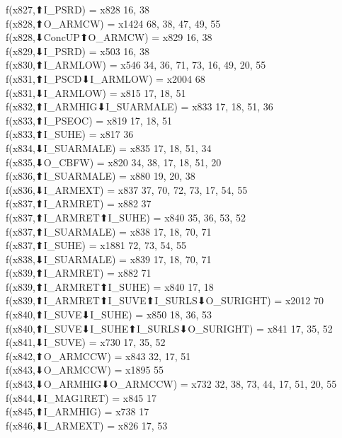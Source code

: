 f(x827,⬆I_PSRD) = x828 {16, 38} \\
f(x828,⬆O_ARMCW) = x1424 {68, 38, 47, 49, 55} \\
f(x828,⬇ConcUP⬆O_ARMCW) = x829 {16, 38} \\
f(x829,⬇I_PSRD) = x503 {16, 38} \\
f(x830,⬆I_ARMLOW) = x546 {34, 36, 71, 73, 16, 49, 20, 55} \\
f(x831,⬆I_PSCD⬇I_ARMLOW) = x2004 {68} \\
f(x831,⬇I_ARMLOW) = x815 {17, 18, 51} \\
f(x832,⬆I_ARMHIG⬇I_SUARMALE) = x833 {17, 18, 51, 36} \\
f(x833,⬆I_PSEOC) = x819 {17, 18, 51} \\
f(x833,⬆I_SUHE) = x817 {36} \\
f(x834,⬇I_SUARMALE) = x835 {17, 18, 51, 34} \\
f(x835,⬇O_CBFW) = x820 {34, 38, 17, 18, 51, 20} \\
f(x836,⬆I_SUARMALE) = x880 {19, 20, 38} \\
f(x836,⬇I_ARMEXT) = x837 {37, 70, 72, 73, 17, 54, 55} \\
f(x837,⬆I_ARMRET) = x882 {37} \\
f(x837,⬆I_ARMRET⬆I_SUHE) = x840 {35, 36, 53, 52} \\
f(x837,⬆I_SUARMALE) = x838 {17, 18, 70, 71} \\
f(x837,⬆I_SUHE) = x1881 {72, 73, 54, 55} \\
f(x838,⬇I_SUARMALE) = x839 {17, 18, 70, 71} \\
f(x839,⬆I_ARMRET) = x882 {71} \\
f(x839,⬆I_ARMRET⬆I_SUHE) = x840 {17, 18} \\
f(x839,⬆I_ARMRET⬆I_SUVE⬆I_SURLS⬇O_SURIGHT) = x2012 {70} \\
f(x840,⬆I_SUVE⬇I_SUHE) = x850 {18, 36, 53} \\
f(x840,⬆I_SUVE⬇I_SUHE⬆I_SURLS⬇O_SURIGHT) = x841 {17, 35, 52} \\
f(x841,⬇I_SUVE) = x730 {17, 35, 52} \\
f(x842,⬆O_ARMCCW) = x843 {32, 17, 51} \\
f(x843,⬇O_ARMCCW) = x1895 {55} \\
f(x843,⬇O_ARMHIG⬇O_ARMCCW) = x732 {32, 38, 73, 44, 17, 51, 20, 55} \\
f(x844,⬇I_MAG1RET) = x845 {17} \\
f(x845,⬆I_ARMHIG) = x738 {17} \\
f(x846,⬇I_ARMEXT) = x826 {17, 53} \\
